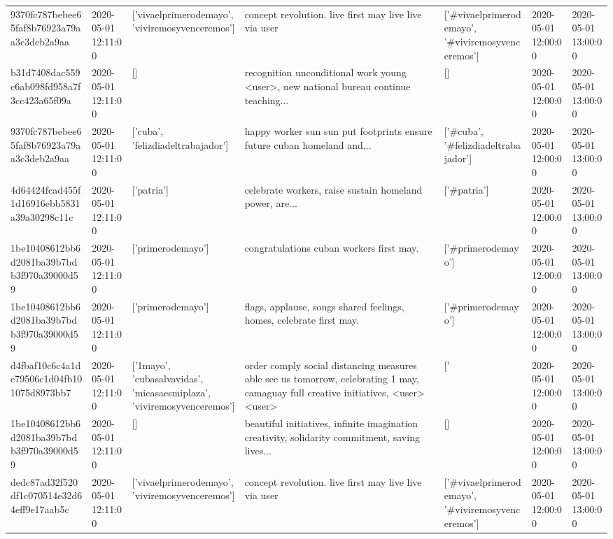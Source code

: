 \begin{tabular}{lllllll}
9370fc787bebee65faf8b76923a79aa3c3deb2a9aa & 2020-05-01 12:11:00 & ['vivaelprimerodemayo', 'viviremosyvenceremos'] & concept revolution. live first may live live via user & ['#vivaelprimerodemayo', '#viviremosyvenceremos'] & 2020-05-01 12:00:00 & 2020-05-01 13:00:00 \\
b31d7408dac559c6ab098fd958a7f3cc423a65f09a & 2020-05-01 12:11:00 & [] & recognition unconditional work young <user>, new national bureau continue teaching... & [] & 2020-05-01 12:00:00 & 2020-05-01 13:00:00 \\
9370fc787bebee65faf8b76923a79aa3c3deb2a9aa & 2020-05-01 12:11:00 & ['cuba', 'felizdiadeltrabajador'] & happy worker sun sun put footprints ensure future cuban homeland and... & ['#cuba', '#felizdiadeltrabajador'] & 2020-05-01 12:00:00 & 2020-05-01 13:00:00 \\
4d64424fcad455f1d16916ebb5831a39a30298c11c & 2020-05-01 12:11:00 & ['patria'] & celebrate workers, raise sustain homeland power, are... & ['#patria'] & 2020-05-01 12:00:00 & 2020-05-01 13:00:00 \\
1be10408612bb6d2081ba39b7bdb3f970a39000d59 & 2020-05-01 12:11:00 & ['primerodemayo'] & congratulations cuban workers first may. & ['#primerodemayo'] & 2020-05-01 12:00:00 & 2020-05-01 13:00:00 \\
1be10408612bb6d2081ba39b7bdb3f970a39000d59 & 2020-05-01 12:11:00 & ['primerodemayo'] & flags, applause, songs shared feelings, homes, celebrate first may. & ['#primerodemayo'] & 2020-05-01 12:00:00 & 2020-05-01 13:00:00 \\
d4fbaf10c6c4a1de79506c1d04fb101075d8973bb7 & 2020-05-01 12:11:00 & ['1mayo', 'cubasalvavidas', 'micasaesmiplaza', 'viviremosyvenceremos'] & order comply social distancing measures able see us tomorrow, celebrating 1 may, camaguay full creative initiatives, <user> <user> & ['#1mayo', '#cubasalvavidas', '#micasaesmiplaza', '#viviremosyvenceremos'] & 2020-05-01 12:00:00 & 2020-05-01 13:00:00 \\
1be10408612bb6d2081ba39b7bdb3f970a39000d59 & 2020-05-01 12:11:00 & [] & beautiful initiatives, infinite imagination creativity, solidarity commitment, saving lives... & [] & 2020-05-01 12:00:00 & 2020-05-01 13:00:00 \\
dedc87ad32f520df1c070514e32d64eff9e17aab5c & 2020-05-01 12:11:00 & ['vivaelprimerodemayo', 'viviremosyvenceremos'] & concept revolution. live first may live live via user & ['#vivaelprimerodemayo', '#viviremosyvenceremos'] & 2020-05-01 12:00:00 & 2020-05-01 13:00:00 \\

\end{tabular}
